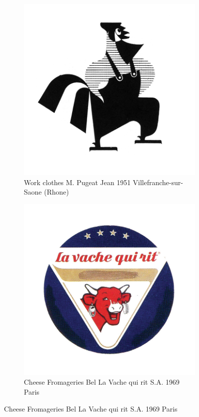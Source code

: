 \begin{figure}[h]
  \begin{subfigure}{.45\textwidth}
    \centering
    \includegraphics[width=.5\linewidth]{images/supplement/trademarks/french/10_51}
    \caption{Work clothes M. Pugeat Jean 1951 Villefranche-sur-Saone (Rhone)}
    \label{fig:trademarks:french:10.51}
  \end{subfigure}\hfill
  \begin{subfigure}{.45\textwidth}
    \centering
    \includegraphics[width=.5\linewidth]{images/supplement/trademarks/french/10_90}
    \caption{Cheese Fromageries Bel La Vache qui rit S.A. 1969 Paris}
    \label{fig:trademarks:french:10.90}
  \end{subfigure}
\end{figure}

\clearpage

